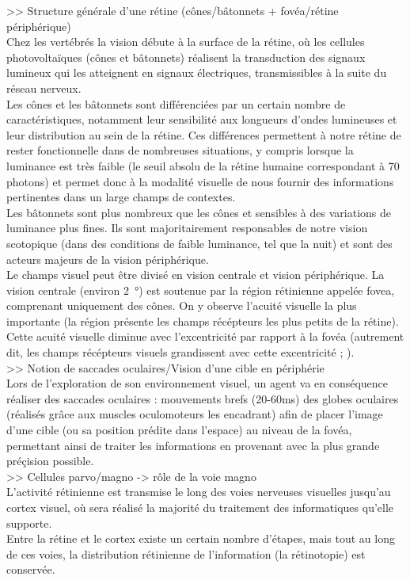 >> Structure générale d'une rétine (cônes/bâtonnets + fovéa/rétine périphérique)\\
Chez les vertébrés la vision débute à la surface de la rétine, où les cellules photovoltaïques (cônes et bâtonnets) réalisent la transduction des signaux lumineux qui les atteignent en signaux électriques, transmissibles à la suite du réseau nerveux.\\
Les cônes et les bâtonnets sont différenciées par un certain nombre de caractéristiques, notamment leur sensibilité aux longueurs d'ondes lumineuses et leur distribution au sein de la rétine. Ces différences permettent à notre rétine de rester fonctionnelle dans de nombreuses situations, y compris lorsque la luminance est très faible (le seuil absolu de la rétine humaine correspondant à 70 photons) et permet donc à la modalité visuelle de nous fournir des informations pertinentes dans un large champs de contextes.\\
Les bâtonnets sont plus nombreux que les cônes et sensibles à des variations de luminance plus fines. Ils sont majoritairement responsables de notre vision scotopique (dans des conditions de faible luminance, tel que la nuit) et sont des acteurs majeurs de la vision périphérique.\\
Le champs visuel peut être divisé en vision centrale et vision périphérique. La vision centrale (environ \SI{2}{\degree}) est soutenue par la région rétinienne appelée fovea, comprenant uniquement des cônes. On y observe l'acuité visuelle la plus importante (la région présente les champs récépteurs les plus petits de la rétine). Cette acuité visuelle diminue avec l'excentricité par rapport à la fovéa (autrement dit, les champs récépteurs visuels grandissent avec cette excentricité ; \cite{Werner2014}).\\

>> Notion de saccades oculaires/Vision d'une cible en périphérie\\
Lors de l'exploration de son environnement visuel, un agent va en conséquence réaliser des saccades oculaires : mouvements brefs (20-60\si{\milli\second}) des globes oculaires (réalisés grâce aux muscles oculomoteurs les encadrant) afin de placer l'image d'une cible (ou sa position prédite dans l'espace) au niveau de la fovéa, permettant ainsi de traiter les informations en provenant avec la plus grande préçision possible.\\

>> Cellules parvo/magno -> rôle de la voie magno\\
L'activité rétinienne est transmise le long des voies nerveuses visuelles jusqu'au cortex visuel, où sera réalisé la majorité du traitement des informatiques qu'elle supporte. \\
Entre la rétine et le cortex existe un certain nombre d'étapes, mais tout au long de ces voies, la distribution rétinienne de l'information  (la rétinotopie) est conservée. 

